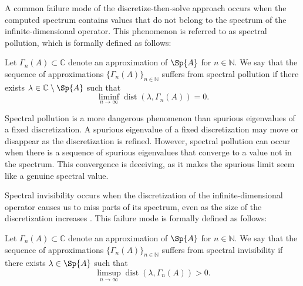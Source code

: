  A common failure mode of the discretize-then-solve approach occurs when the computed spectrum contains values that do not belong to the spectrum of the infinite-dimensional operator. This phenomenon is referred to as spectral pollution, which is formally defined as follows:
\begin{definition}
    Let $\Gamma_n(A) \subset \mathbb{C}$ denote an approximation of $\Sp{A}$ for $n \in \mathbb{N}.$ We say that the sequence of approximations $\{\Gamma_n(A)\}_{n \in \mathbb{N}}$ suffers from spectral pollution if there exists $\lambda \in \mathbb{C} \setminus \Sp{A}$ such that 
    \begin{equation}
        \liminf_{n \rightarrow \infty} \operatorname{dist}(\lambda, \Gamma_n(A))= 0.
    \end{equation}
\end{definition}Spectral pollution is a more dangerous phenomenon than spurious eigenvalues of a fixed discretization. A spurious eigenvalue of a fixed discretization may move or disappear as the discretization is refined. However, spectral pollution can occur when there is a sequence of spurious eigenvalues that converge to a value not in the spectrum. This convergence is deceiving, as it makes the spurious limit seem like a genuine spectral value. 

Spectral invisibility occurs when the discretization of the infinite-dimensional operator causes us to miss parts of its spectrum, even as the size of the discretization increases \cite{Matt}. This failure mode is formally defined as follows:
\begin{definition}
    Let $\Gamma_n(A) \subset \mathbb{C}$ denote an approximation of $\Sp{A}$ for $n \in \mathbb{N}.$ We say that the sequence of approximations $\{\Gamma_n(A)\}_{n \in \mathbb{N}}$ suffers from spectral invisibility if there exists $\lambda \in \Sp{A}$ such that 
        \begin{equation}
        \limsup_{n \rightarrow \infty} \operatorname{dist}(\lambda, \Gamma_n(A))> 0.
    \end{equation}
\end{definition}


